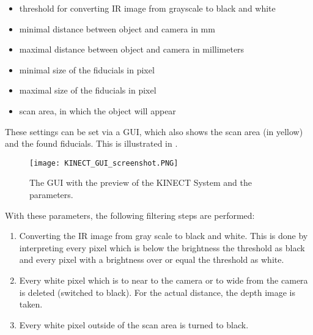 \begin{itemize}
\item threshold for converting IR image from grayscale to black and white
\item minimal distance between object and camera in mm
\item maximal distance between object and camera in millimeters
\item minimal size of the fiducials in pixel
\item maximal size of the fiducials in pixel
\item scan area, in which the object will appear 
\end{itemize}
These settings can be set via a GUI, which also shows the scan area (in yellow) and the found fiducials. This is illustrated in .
\begin{figure}[!t]
\centering
\texttt{[image: KINECT\_GUI\_screenshot.PNG]}
\caption{The GUI with the preview of the KINECT System and the parameters.}
\label{fig:KINECT_GUI_screenshot}
\end{figure}
With these parameters, the following filtering steps are performed:
\begin{enumerate}
\item Converting the IR image from gray scale to black and white. This is done by interpreting every pixel which is below the brightness the threshold as black and every pixel with a brightness over or equal the threshold as white.
\item Every white pixel which is to near to the camera or to wide from the camera is deleted (switched to black). For the actual distance, the depth image is taken. 
\item Every white pixel outside of the scan area is turned to black. 
\end{enumerate}

